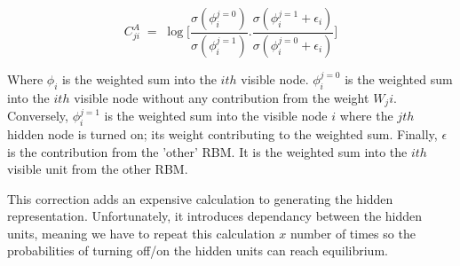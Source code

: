$$C^A_{ji} \; = \;\log \bigg[ \frac{\sigma (\phi_i^{j=0})}{\sigma (\phi_i^{j=1})} . \frac{\sigma (\phi_i^{j=1} + \epsilon_i) }{\sigma (\phi_i^{j=0} + \epsilon_i)} \bigg] $$

Where $ \phi_i $ is the weighted sum into the $ith$ visible node. $\phi_i^{j=0} $ is the weighted sum into the $ith$ visible node without any contribution from the weight $ W_ji $. Conversely, $ \phi_i^{j=1} $ is the weighted sum into the visible node $i$ where the $jth$ hidden node is turned on; its weight contributing to the weighted sum. Finally, $ \epsilon $ is the contribution from the 'other' RBM. It is the weighted sum into the $ith$ visible unit from the other RBM.

This correction adds an expensive calculation to generating the hidden representation. Unfortunately, it introduces dependancy between the hidden units, meaning we have to repeat this calculation $x$ number of times so the probabilities of turning off/on the hidden units can reach equilibrium.
